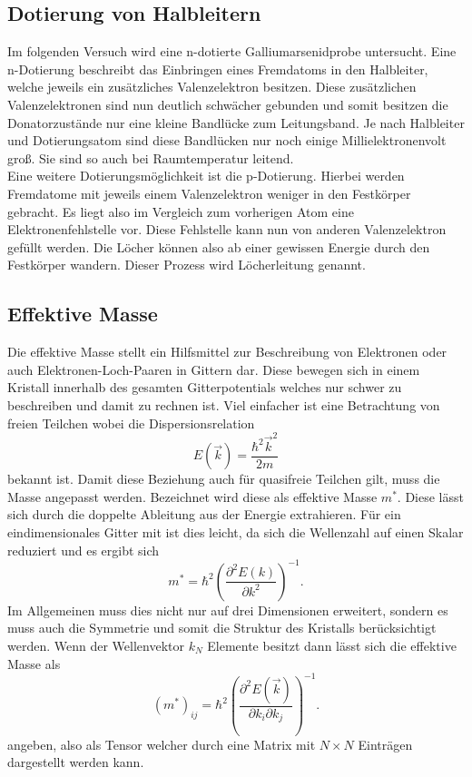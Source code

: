 \subsection{Dotierung von Halbleitern}
Im folgenden Versuch wird eine n-dotierte 
Galliumarsenidprobe untersucht. Eine n-Dotierung beschreibt das Einbringen eines Fremdatoms in den Halbleiter, welche jeweils ein zusätzliches Valenzelektron besitzen. Diese
zusätzlichen Valenzelektronen sind nun deutlich schwächer gebunden und somit besitzen die Donatorzustände nur eine kleine Bandlücke zum Leitungsband. Je nach Halbleiter und Dotierungsatom sind
diese Bandlücken nur noch einige Millielektronenvolt groß. Sie sind so auch bei Raumtemperatur leitend.
\\
Eine weitere Dotierungsmöglichkeit ist die p-Dotierung. Hierbei werden Fremdatome mit jeweils einem Valenzelektron weniger in den Festkörper gebracht. Es liegt also im Vergleich zum vorherigen Atom eine Elektronenfehlstelle vor. 
Diese Fehlstelle kann nun von anderen Valenzelektron gefüllt werden. Die Löcher können also ab einer gewissen Energie durch den Festkörper wandern. Dieser Prozess wird Löcherleitung genannt.

\subsection{Effektive Masse}

Die effektive Masse stellt ein Hilfsmittel zur Beschreibung von Elektronen oder auch Elektronen-Loch-Paaren in Gittern dar. Diese bewegen sich in einem Kristall
innerhalb des gesamten Gitterpotentials welches nur schwer zu beschreiben und damit zu rechnen ist. Viel einfacher ist eine Betrachtung von freien Teilchen wobei
die Dispersionsrelation
\begin{equation}
E(\vec{k}) = \frac{\hbar^2 \vec{k}^2}{2m}
\end{equation}
bekannt ist. Damit diese Beziehung auch für quasifreie Teilchen gilt, muss die Masse angepasst werden. Bezeichnet wird diese
als effektive Masse $m^*$. Diese lässt sich durch die doppelte Ableitung aus der Energie extrahieren. Für ein eindimensionales Gitter mit ist dies leicht, da
sich die Wellenzahl auf einen Skalar reduziert und es ergibt sich
\begin{equation*}
m^* = \hbar^2 \left( \frac{\partial^2 E(k)}{\partial k^2} \right)^{-1}.
\end{equation*}
Im Allgemeinen muss dies nicht nur auf drei Dimensionen erweitert, sondern es muss auch die Symmetrie und somit die Struktur des Kristalls berücksichtigt werden.
Wenn der Wellenvektor $k_N$ Elemente besitzt dann lässt sich die effektive Masse als 
\begin{equation}
    (m^*)_{ij} = \hbar^2 \left( \frac{\partial^2 E(\vec{k})}{\partial k_i \partial k_j} \right)^{-1}. 
\end{equation}
angeben, also als Tensor welcher durch eine Matrix mit $N \times N$ Einträgen dargestellt werden kann.

